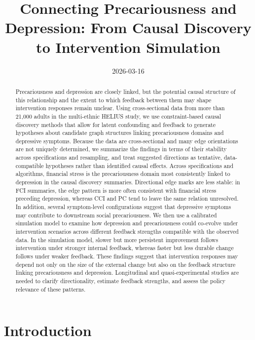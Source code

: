 \documentclass[
]{article}
\title{Connecting Precariousness and Depression: From Causal Discovery
to Intervention Simulation}
\author{%
}
\date{2026-03-16}
\begin{document}
\maketitle
\begin{abstract}
\noindent \textcolor{BrickRed}{Precariousness and depression are closely linked, but the potential causal structure of this relationship and the extent to which feedback between them may shape intervention responses remain unclear. Using cross-sectional data from more than 21,000 adults in the multi-ethnic HELIUS study, we use constraint-based causal discovery methods that allow for latent confounding and feedback to generate hypotheses about candidate graph structures linking precariousness domains and depressive symptoms. Because the data are cross-sectional and many edge orientations are not uniquely determined, we summarize the findings in terms of their stability across specifications and resampling, and treat suggested directions as tentative, data-compatible hypotheses rather than identified causal effects. Across specifications and algorithms, financial stress is the precariousness domain most consistently linked to depression in the causal discovery summaries. Directional edge marks are less stable: in FCI summaries, the edge pattern is more often consistent with financial stress preceding depression, whereas CCI and PC tend to leave the same relation unresolved. In addition, several symptom-level configurations suggest that depressive symptoms may contribute to downstream social precariousness. We then use a calibrated simulation model to examine how depression and precariousness could co-evolve under intervention scenarios across different feedback strengths compatible with the observed data. In the simulation model, slower but more persistent improvement follows intervention under stronger internal feedback, whereas faster but less durable change follows under weaker feedback. These findings suggest that intervention responses may depend not only on the size of the external change but also on the feedback structure linking precariousness and depression. Longitudinal and quasi-experimental studies are needed to clarify directionality, estimate feedback strengths, and assess the policy relevance of these patterns.}
\end{abstract}


\section{Introduction}\label{introduction}
\end{document}
